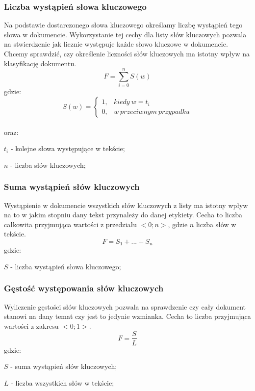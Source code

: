 \documentclass{classrep}
\begin{document}
\subsubsection{Liczba wystąpień słowa kluczowego}
Na podstawie dostarczonego słowa kluczowego określamy liczbę wystąpień tego słowa w dokumencie. Wykorzystanie tej cechy dla listy
słów kluczowych pozwala na stwierdzenie  jak licznie występuje każde słowo kluczowe w dokumencie. Chcemy sprawdzić,
czy określenie liczności słów kluczowych ma istotny wpływ na klasyfikację dokumentu.
\begin{equation}
    F=\sum_{i=0}^{n} S(w)
\end{equation}
gdzie:
\begin{equation} \label{eq:1}
    S(w)=\left\{\begin{matrix}
                    1, & kiedy\ w = t_{i}\\
                    0, & w\ przeciwnym\ przypadku
    \end{matrix}\right.
\end{equation}\\ oraz:
\begin{description}
    \item $t_{i}$ - kolejne słowa występujące w tekście;
    \item $n$ - liczba słów kluczowych;
\end{description}

\subsubsection{Suma wystąpień słów kluczowych}
Wystąpienie w dokumencie wszystkich słów kluczowych z listy ma istotny wpływ na to w jakim stopniu dany tekst
przynależy do danej etykiety. Cecha to liczba całkowita przyjmująca wartości z przedziału $<0; n>$, gdzie $n$ liczba słów w tekście.
\begin{equation}
    F=S_{1} + ... + S_{n}
\end{equation}
gdzie:\\
\begin{description}
    \item $S$ - liczba wystąpień słowa kluczowego;
\end{description}

\clearpage
\subsubsection{Gęstość występowania słów kluczowych}
Wyliczenie gęstości słów kluczowych pozwala na sprawdzenie czy cały dokument stanowi na dany temat czy jest to
jedynie wzmianka. Cecha to liczba przyjmująca wartości z zakresu $<0; 1>$.
    \begin{equation}
      F=\frac{S}{L}
    \end{equation}
gdzie:\\
\begin{description}
    \item $S$ - suma wystąpień słów kluczowych;
    \item $L$ - liczba wszystkich słów w tekście;
\end{description}
\end{document}
